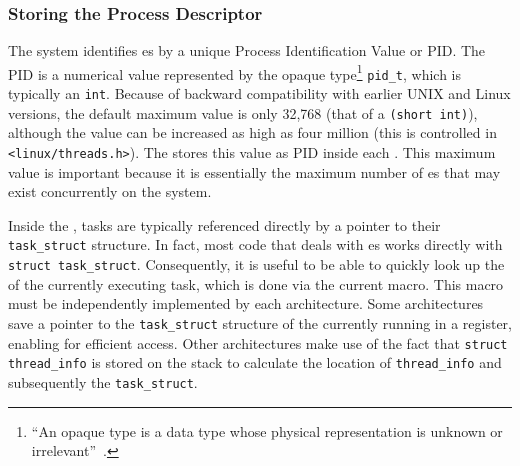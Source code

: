 \subsubsection{Storing the Process Descriptor}\label{subsubsec:Storing_Process_Descriptor}
The system identifies es by a unique Process Identification Value or PID.\@
The PID is a numerical value represented by the opaque type\footnote{``An opaque type is a data type whose physical representation is unknown or irrelevant''~\cite[pg.~26]{LKD3}.} \texttt{pid_t}, which is typically an \texttt{int}.
Because of backward compatibility with earlier UNIX and Linux versions, the default maximum value is only 32,768 (that of a \texttt{(short int)}), although the value can be increased as high as four million (this is controlled in \texttt{<linux/threads.h>}).
The  stores this value as PID inside each .
This maximum value is important because it is essentially the maximum number of es that may exist concurrently on the system.

Inside the , tasks are typically referenced directly by a pointer to their \texttt{task_struct} structure.
In fact, most  code that deals with es works directly with \texttt{struct task_struct}.
Consequently, it is useful to be able to quickly look up the  of the currently executing task, which is done via the current macro.
This macro must be independently implemented by each architecture.
Some architectures save a pointer to the \texttt{task_struct} structure of the currently running  in a register, enabling for efficient access.
Other architectures make use of the fact that \texttt{struct thread_info} is stored on the  stack to calculate the location of \texttt{thread_info} and subsequently the \texttt{task_struct}.

